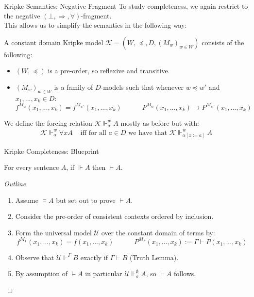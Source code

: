\documentclass[xcolor=dvipsnames,aspectratio=169,handout]{beamer}
\renewcommand{\to}{\Rightarrow}
\newcommand{\KK}{\mathcal{K}}
\newcommand{\UU}{\mathcal U}
\begin{document}
\begin{frame}{Kripke Semantics: Negative Fragment}
	\pause
	To study completeness, we again restrict to the negative $(\bot,\to,\forall)$-fragment.\\
	\pause
	This allows us to simplify the semantics in the following way:
	\vspace{0.3cm}
	\pause
	\begin{definition}
		A constant domain Kripke model $\KK=(W,\preceq, D,(M_w)_{w\in W})$ consists of the following:
		\begin{itemize}
			\item $(W,\preceq)$ is a pre-order, so reflexive and transitive.
			\item $(M_w)_{w\in W}$ is a family of $D$-models such that whenever $w\preceq w'$ and $x_1,...,x_k\in D$:
			$$
			f^{M_{w}}(x_1,...,x_k)=f^{M_{w'}}(x_1,...,x_k)
			\hspace{3em}
			P^{M_{w}}(x_1,...,x_k)\rightarrow P^{M_{w'}}(x_1,...,x_k)
			$$
		\end{itemize}
		\pause
		We define the forcing relation $\KK\Vdash^w_\alpha A$ mostly as before but with:
		\begin{align*}
			\KK\Vdash^w_\alpha \forall x A&\text{ iff for all $a\in D$ we have that $\KK\Vdash^{w}_{\alpha[x:=a]} A$}
		\end{align*}
	\end{definition}
\end{frame}

\begin{frame}{Kripke Completeness: Blueprint}
	\begin{theorem}
		For every sentence $A$, if $\Vdash A$ then $\vdash A$.
	\end{theorem}
	\begin{proof}[Outline]
		\begin{enumerate}
			\pause
			\item
			Assume $\vDash A$ but set out to prove $\vdash A$.
			\pause
			\item
			Consider the pre-order of consistent contexts ordered by inclusion.
			\pause
			\item
			Form the universal model $\UU$ over the constant domain of terms by:
			$$f^{M_{\Gamma}}(x_1,...,x_k)=f(x_1,...,x_k)\hspace{3em}P^{M_{\Gamma}}(x_1,...,x_k):= \Gamma\vdash P(x_1,...,x_k)$$
			\item
			\pause
			Observe that $\UU\Vdash^\Gamma B$ exactly if $\Gamma \vdash B$ (Truth Lemma).
			\pause
			\item
			By assumption of $\vDash A$ in particular $\UU\Vdash^\emptyset_\sigma A$, so $\vdash A$ follows.
			\qedhere
		\end{enumerate}
	\end{proof}
\end{frame}
\end{document}
